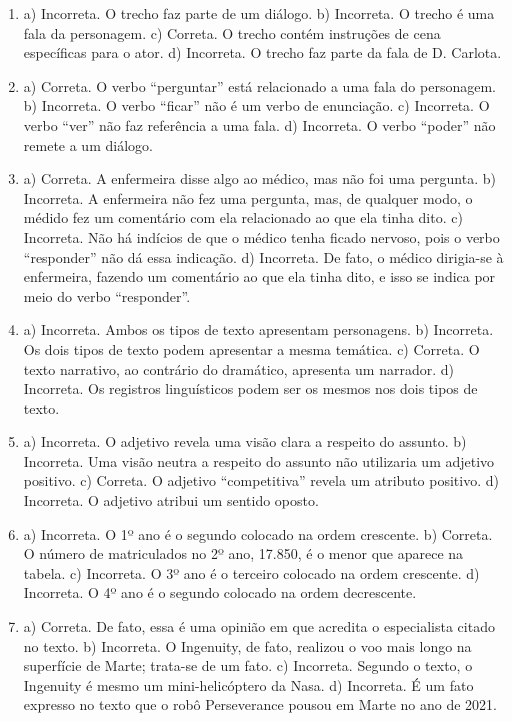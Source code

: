 
\begin{enumerate}
\item
a) Incorreta. O trecho faz parte de um diálogo.
b) Incorreta. O trecho é uma fala da personagem.
c) Correta. O trecho contém instruções de cena específicas para o ator.
d) Incorreta. O trecho faz parte da fala de D. Carlota.

\item
a) Correta. O verbo “perguntar” está relacionado a uma fala do personagem.
b) Incorreta. O verbo “ficar” não é um verbo de enunciação.
c) Incorreta. O verbo “ver” não faz referência a uma fala.
d) Incorreta. O verbo “poder” não remete a um diálogo.

\item
a) Correta. A enfermeira disse algo ao médico, mas não foi uma pergunta.
b) Incorreta. A enfermeira não fez uma pergunta, mas, de qualquer modo, o médido fez um comentário com ela relacionado ao que ela tinha dito.
c) Incorreta. Não há indícios de que o médico tenha ficado nervoso, pois o verbo “responder” não dá essa indicação.
d) Incorreta. De fato, o médico dirigia-se à enfermeira, fazendo um comentário ao que ela tinha dito, e isso se indica por meio do verbo “responder”.

\item
a) Incorreta. Ambos os tipos de texto apresentam personagens.
b) Incorreta. Os dois tipos de texto podem apresentar a mesma temática.
c) Correta. O texto narrativo, ao contrário do dramático, apresenta um narrador.
d) Incorreta. Os registros linguísticos podem ser os mesmos nos dois tipos de texto.

\item
a) Incorreta. O adjetivo revela uma visão clara a respeito do assunto.
b) Incorreta. Uma visão neutra a respeito do assunto não utilizaria um adjetivo positivo.
c) Correta. O adjetivo “competitiva” revela um atributo positivo.
d) Incorreta. O adjetivo atribui um sentido oposto.

\item
a) Incorreta. O 1º ano é o segundo colocado na ordem crescente.
b) Correta. O número de matriculados no 2º ano, 17.850, é o menor que aparece na tabela.
c) Incorreta. O 3º ano é o terceiro colocado na ordem crescente.
d) Incorreta. O 4º ano é o segundo colocado na ordem decrescente.

\item
a) Correta. De fato, essa é uma opinião em que acredita o especialista citado no texto.
b) Incorreta. O Ingenuity, de fato, realizou o voo mais longo na superfície de Marte; trata-se de um fato.
c) Incorreta. Segundo o texto, o Ingenuity é mesmo um mini-helicóptero da Nasa.
d) Incorreta. É um fato expresso no texto que o robô Perseverance pousou em Marte no ano de 2021.


\end{enumerate}
